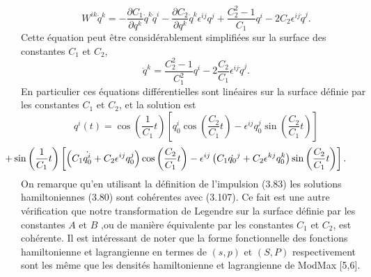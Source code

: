 \documentclass[12pt,a4paper, openany]{report}
\begin{document}
	\begin{equation}
		W^{ik}\ddot{q}^k=-\frac{\partial C_1}{\partial {q}^k}\dot{q}^k\dot{q}^i-\frac{\partial C_2}{\partial{q}^k}\dot{q}^k\epsilon^{ij}q^j+\frac{C^{2}_2-1}{C_1}q^i -2C_2\epsilon^{ij}\dot{q}^j .
	\end{equation} Cette équation peut \^{e}tre considérablement simplifiées sur la surface des constantes $C_1$ et $C_2$,
	\begin{equation}
		\ddot{q}^k=\frac{C^{2}_2-1}{C^2_1}q^i -2\frac{C_2}{C_1}\epsilon^{ij}\dot{q}^j .	
	\end{equation} En particulier ces équations différentielles sont linéaires sur la surface définie par les constantes $C_1$ et $C_2$, et la solution est 
	\begin{equation*}
		q^i(t)=\cos\left(\frac{1}{C_1}t\right)\left[q_0^i\cos\left(\frac{C_2}{C_1}t\right)-\epsilon^{ij}q_0^j\sin\left(\frac{C_2}{C_1}t\right)\right]
	\end{equation*}
	\begin{equation}
		\hspace{-1.5cm}+\sin\left(\frac{1}{C_1}t\right)\left[\left(C_1\dot{q^i_0}+C_2\epsilon^{ij}q^j_0\right)\cos\left(\frac{C_2}{C_1}t\right)-\epsilon^{ij}\left(C_1\dot{q_0}^j+C_2\epsilon^{kj}q^k_0\right)\sin\left(\frac{C_2}{C_1}t\right)\right].
	\end{equation} On remarque qu'en utilisant la définition de l'impulsion (3.83) les solutions hamiltoniennes (3.80) sont cohérentes avec (3.107). Ce fait est une autre vérification que notre transformation de Legendre sur la surface définie par les constantes $A$ et $B$ ,ou de manière équivalente par les constantes $C_1$ et $C_2$, est cohérente. Il est intéressant de noter que la forme fonctionnelle des fonctions hamiltonienne et lagrangienne en termes de $(s,p)$ et  $(S,P)$ respectivement sont les m\^{e}me que les densités hamiltonienne et lagrangienne de ModMax [5,6].
\end{document}
